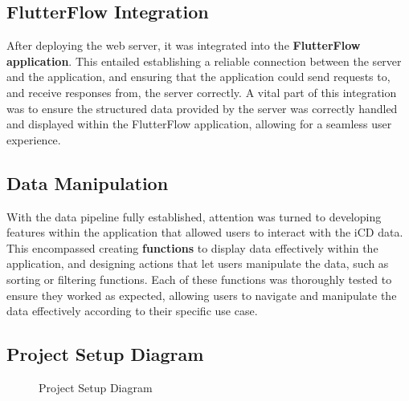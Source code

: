 \subsection{FlutterFlow Integration}
After deploying the web server, it was integrated into the {\color{limeGreen}\textbf{FlutterFlow application}}. 
This entailed establishing a reliable connection between the server and the application, and ensuring that the application could send requests to, and receive responses from, the server correctly. 
A vital part of this integration was to ensure the structured data provided by the server was correctly handled and displayed within the FlutterFlow application, allowing for a seamless user experience.

\subsection{Data Manipulation}

With the data pipeline fully established, attention was turned to developing features within the application that allowed users to interact with the iCD data. 
This encompassed creating {\color{limeGreen}\textbf{functions}} to display data effectively within the application, and designing actions that let users manipulate the data, such as sorting or filtering functions. 
Each of these functions was thoroughly tested to ensure they worked as expected, allowing users to navigate and manipulate the data effectively according to their specific use case.

\subsection{Project Setup Diagram}
\begin{figure}[H]
    \centering
    \caption{ Project Setup Diagram }
    \label{fig: Project_Setup_Diagram}
\end{figure}


